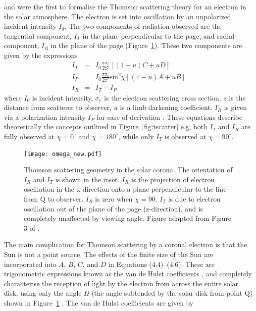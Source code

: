 \citet{schuster1879} and \citet{minnaert1930} were the first to formalise the Thomson scattering theory for an electron in the solar atmosphere. The electron is set into oscillation by an unpolarized  incident intensity $I_0$.
The two components of radiation observed are the tangential component, $I_T$ in the plane perpendicular to the page, and radial component, $I_R$ in the plane of the page (Figure~\ref{fig:omega}). 
These two components are given by the expressions 
\begin{eqnarray}
\label{eqn:I_components1}
I_T &=& I_0\frac{\pi \sigma_e}{2z^2}[(1-u)C +uD] \\
I_P &=& I_0\frac{\pi \sigma_e}{2z^2}\mathrm{sin}^2\chi[(1-u)A +uB] \\
I_R &=& I_T-I_P
\label{eqn:I_components2}
\end{eqnarray}
where $I_0$ is incident intensity, $\sigma_e$ is the electron scattering cross section, $z$ is the distance from scatterer to observer, $u$ is a limb darkening coefficient. $I_R$ is given via a polarization intensity $I_P$ for ease of derivation \citep{howtap2009}. These equations describe theoretically the concepts outlined in Figure~\ref{fig:tscatter} e.g, both $I_T$ and $I_R$ are fully observed at $\chi=0^{\circ}$ and $\chi=180^{\circ}$, while only $I_T$ is observed at $\chi=90^{\circ}$. 
\begin{figure}[!t]
\begin{center}
\texttt{[image: omega\_new.pdf]}
\caption[Thomson scattering geometry in the solar corona]{Thomson scattering geometry in the solar corona. The orientation of $I_R$ and $I_T$ is shown in the inset. $I_R$ is the projection of electron oscillation in the x direction onto a plane perpendicular to the line from Q to observer. $I_R$ is zero when $\chi=90$. $I_T$ is due to electron oscillation out of the plane of the page (z-direction), and is completely unaffected by viewing angle. Figure adapted from Figure 3 of \citet{howtap2009}.}
\label{fig:omega}
\end{center}
\end{figure}
The main complication for Thomson scattering by a coronal electron is that the Sun is not a point source. The effects of the finite size of the Sun are incorporated into $A$, $B$, $C$, and $D$ in Equations (4.4)--(4.6). These are trigonometric expressions known as the van de Hulst coefficients \citep{vdeh50}, and completely characterise the reception of light by the electron from across the entire solar disk, using only the angle $\Omega$ (the angle subtended by the solar disk from point Q) shown in Figure~\ref{fig:omega} \citep{minnaert1930, billings1966, billings1966}. The van de Hulst coefficients are given by
